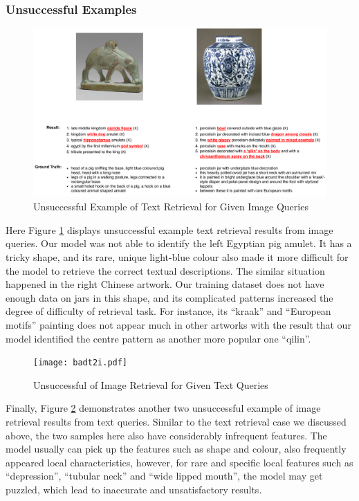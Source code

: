 \subsubsection{Unsuccessful Examples}

\begin{figure}[h!]
\centering
\includegraphics[width=\textwidth]{badi2t.pdf}
\caption{Unsuccessful Example of Text Retrieval for Given Image Queries}
\label{fig:badi2t}
\end{figure}

Here Figure \ref{fig:badi2t} displays unsuccessful example text retrieval results from image queries. Our model was not able to identify the left Egyptian pig amulet. It has a tricky shape, and its rare, unique light-blue colour also made it more difficult for the model to retrieve the correct textual descriptions. The similar situation happened in the right Chinese artwork. Our training dataset does not have enough data on jars in this shape, and its complicated patterns increased the degree of difficulty of retrieval task. For instance, its ``kraak'' and ``European motifs'' painting does not appear much in other artworks with the result that our model identified the centre pattern as another more popular one ``qilin''.

\begin{figure}[h!]
\centering
\texttt{[image: badt2i.pdf]}
\caption{Unsuccessful of Image Retrieval for Given Text Queries}
\label{fig:badt2i}
\end{figure}

Finally, Figure \ref{fig:badt2i} demonstrates another two unsuccessful example of image retrieval results from text queries. Similar to the text retrieval case we discussed above, the two samples here also have considerably infrequent features. The model usually can pick up the features such as shape and colour, also frequently appeared local characteristics, however, for rare and specific local features such as ``depression'', ``tubular neck'' and ``wide lipped mouth'', the model may get puzzled, which lead to inaccurate and unsatisfactory results.

